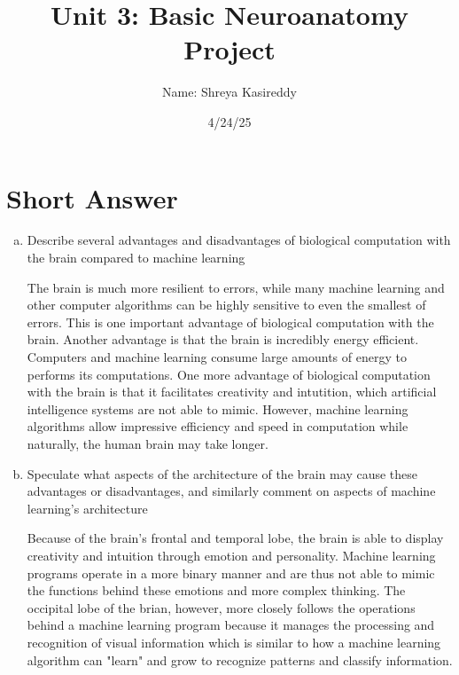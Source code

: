 \documentclass[letterpaper,11pt]{article}
\begin{document}
\title{{\bf Unit 3: Basic Neuroanatomy Project} }
\author{Name: Shreya Kasireddy}

\date{4/24/25}
\maketitle

\section*{Short Answer}
\begin{enumerate}[a)]
\item Describe several advantages and disadvantages of biological computation with the brain compared to machine learning

\begin{tcolorbox}
The brain is much more resilient to errors, while many machine learning and other computer algorithms can be highly sensitive to even the smallest of errors. This is one important advantage of biological computation with the brain. Another advantage is that the brain is incredibly energy efficient. Computers and machine learning consume large amounts of energy to performs its computations. One more advantage of biological computation with the brain is that it facilitates creativity and intutition, which artificial intelligence systems are not able to mimic. However, machine learning algorithms allow impressive efficiency and speed in computation while naturally, the human brain may take longer. 
\end{tcolorbox}

\item Speculate what aspects of the architecture of the brain may cause these advantages or disadvantages, and similarly comment on aspects of machine learning’s architecture

\begin{tcolorbox}
Because of the brain's frontal and temporal lobe, the brain is able to display creativity and intuition through emotion and personality. Machine learning programs operate in a more binary manner and are thus not able to mimic the functions behind these emotions and more complex thinking. The occipital lobe of the brian, however, more closely follows the operations behind a machine learning program because it manages the processing and recognition of visual information which is similar to how a machine learning algorithm can "learn" and grow to recognize patterns and classify information. 
\end{tcolorbox}


\end{enumerate}
\end{document}
